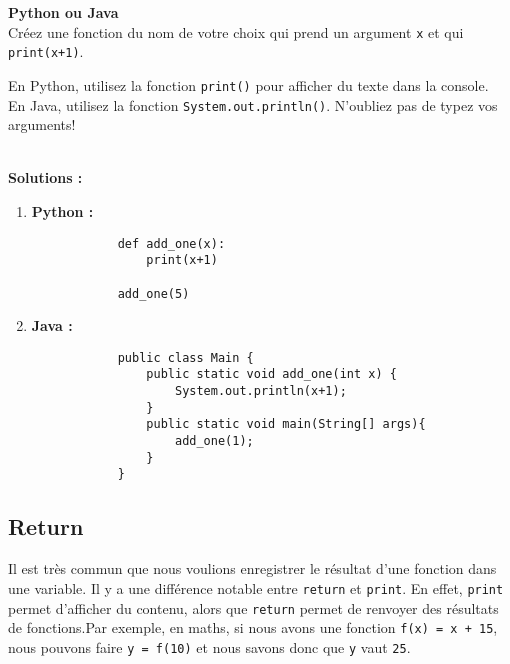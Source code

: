 \begin{Exercice}[5 minutes] \textbf{Python ou Java} \\
    Créez une fonction du nom de votre choix qui prend un argument \lstinline{x} et qui \lstinline{print(x+1)}.
        
    \begin{conseil}
        En Python, utilisez la fonction \lstinline{print()} pour afficher du texte dans la console. \\
        En Java, utilisez la fonction \lstinline{System.out.println()}. N'oubliez pas de typez vos arguments!
    \end{conseil}
    \\
    \textbf{Solutions :}
    \begin{enumerate}
        \item \textbf{Python :}
        \begin{verbatim}
            def add_one(x):
                print(x+1)
                
            add_one(5)
        \end{verbatim}
        \item \textbf{Java :}
        \begin{verbatim}
            public class Main {
                public static void add_one(int x) {
                    System.out.println(x+1); 
                }
                public static void main(String[] args){
                    add_one(1);
                }
            }
        \end{verbatim}
    \end{enumerate}
        

\end{Exercice}

\subsection{Return}
Il est très commun que nous voulions enregistrer le résultat d'une fonction dans une variable. Il y a une différence notable entre \lstinline{return} et \lstinline{print}. En effet, \lstinline{print} permet d'afficher du contenu, alors que \lstinline{return} permet de renvoyer des résultats de fonctions.Par exemple, en maths, si nous avons une fonction \lstinline{f(x) = x + 15}, nous pouvons faire \lstinline{y = f(10)} et nous savons donc que \lstinline{y} vaut \lstinline{25}. 

